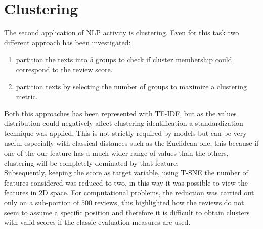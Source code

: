 \documentclass[11pt]{article}
\begin{document}
\section{Clustering}
The second application of NLP activity is clustering. Even for this task two different approach has been investigated:
\begin{enumerate}
    \item partition the texts into $5$ groups to check if cluster membership could correspond to the review score.
    \item partition texts by selecting the number of groups to maximize a clustering metric.
\end{enumerate}
Both this approaches has been represented with TF-IDF, but as the values distribution could negatively affect clustering identification a standardization technique was applied. This is not strictly required by models but can be very useful especially with classical distances such as the Euclidean one, this because if one of the our feature has a much wider range of values than the others, clustering will be completely dominated by that feature.\\
Subsequently, keeping the score as target variable, using T-SNE the number of features considered was reduced to two, in this way it was possible to view the features in 2D space.
For computational problems, the reduction was carried out only on a sub-portion of $500$ reviews, this highlighted how the reviews do not seem to assume a specific position and therefore it is difficult to obtain clusters with valid scores if the classic evaluation measures are used. 
\end{document}
